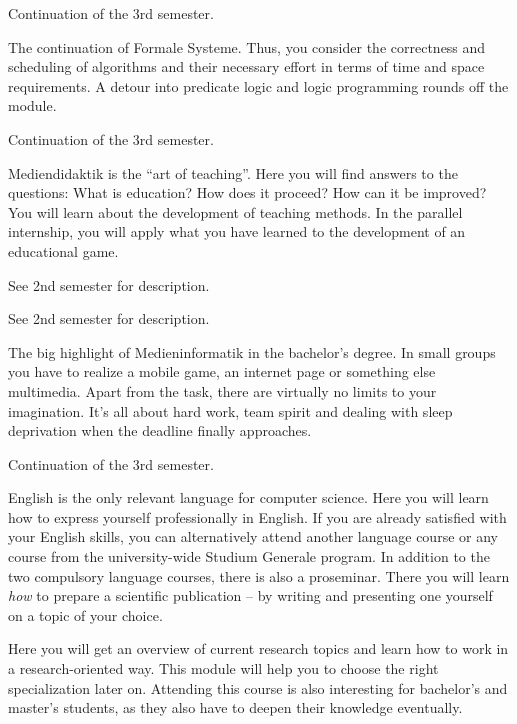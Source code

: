 Continuation of the 3rd semester.

The continuation of Formale Systeme.
Thus, you consider the correctness and scheduling of algorithms and their necessary effort in terms of time and space requirements.
A detour into predicate logic and logic programming rounds off the module.

Continuation of the 3rd semester.

Mediendidaktik is the \enquote{art of teaching}.
Here you will find answers to the questions:
What is education?
How does it proceed?
How can it be improved?
You will learn about the development of teaching methods.
In the parallel internship, you will apply what you have learned to the development of an educational game.

See 2nd semester for description.

See 2nd semester for description.

The big highlight of Medieninformatik in the bachelor's degree.
In small groups you have to realize a mobile game, an internet page or something else multimedia.
Apart from the task, there are virtually no limits to your imagination.
It's all about hard work, team spirit and dealing with sleep deprivation when the deadline finally approaches.

Continuation of the 3rd semester.

English is the only relevant language for computer science.
Here you will learn how to express yourself professionally in English.
If you are already satisfied with your English skills, you can alternatively attend another language course or any course from the university-wide Studium Generale program.
In addition to the two compulsory language courses, there is also a proseminar.
There you will learn \textit{how} to prepare a scientific publication -- by writing and presenting one yourself on a topic of your choice.

Here you will get an overview of current research topics and learn how to work in a research-oriented way.
This module will help you to choose the right specialization later on. Attending this course is also interesting for bachelor's and master's students, as they also have to deepen their knowledge eventually.

